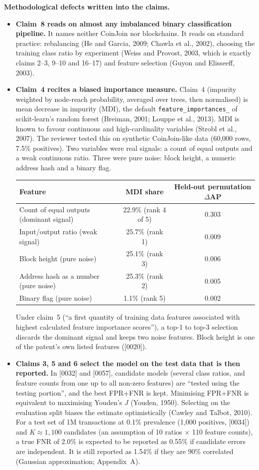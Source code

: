 \documentclass[10pt,a4paper]{article}
\begin{document}
\noindent\textbf{Methodological defects written into the claims.}
\begin{itemize}
  \item \textbf{Claim~8 reads on almost any imbalanced binary classification pipeline.} It names neither CoinJoin nor blockchains. It reads on standard practice: rebalancing (He and Garcia, 2009; Chawla et al., 2002), choosing the training class ratio by experiment (Weiss and Provost, 2003, which is exactly claims 2--3, 9--10 and 16--17) and feature selection (Guyon and Elisseeff, 2003).
  \item \textbf{Claim~4 recites a biased importance measure.} Claim~4 (impurity weighted by node-reach probability, averaged over trees, then normalised) is mean decrease in impurity (MDI), the default \texttt{feature\_importances\_} of scikit-learn's random forest (Breiman, 2001; Louppe et al., 2013). MDI is known to favour continuous and high-cardinality variables (Strobl et al., 2007). The reviewer tested this on synthetic CoinJoin-like data (60,000 rows, 7.5\% positives). Two variables were real signals: a count of equal outputs and a weak continuous ratio. Three were pure noise: block height, a numeric address hash and a binary flag.
  \begin{center}\small
  \begin{tabular}{lcc}
  \toprule
  Feature & MDI share & Held-out permutation $\Delta$AP \\
  \midrule
  Count of equal outputs (dominant signal) & 22.9\% (rank 4 of 5) & 0.303 \\
  Input/output ratio (weak signal) & 25.7\% (rank 1) & 0.009 \\
  Block height (pure noise) & 25.1\% (rank 3) & 0.006 \\
  Address hash as a number (pure noise) & 25.3\% (rank 2) & 0.005 \\
  Binary flag (pure noise) & 1.1\% (rank 5) & 0.002 \\
  \bottomrule
  \end{tabular}
  \end{center}
  Under claim~5 (``a first quantity of training data features associated with highest calculated feature importance scores''), a top-1 to top-3 selection discards the dominant signal and keeps two noise features. Block height is one of the patent's own listed features ([0020]).
  \item \textbf{Claims 3, 5 and 6 select the model on the test data that is then reported.} In [0032] and [0057], candidate models (several class ratios, and feature counts from one up to all non-zero features) are ``tested using the testing portion'', and the best FPR+FNR is kept. Minimising FPR+FNR is equivalent to maximising Youden's $J$ (Youden, 1950). Selecting on the evaluation split biases the estimate optimistically (Cawley and Talbot, 2010). For a test set of 1M transactions at 0.1\% prevalence (1,000 positives, [0034]) and $K\approx1{,}100$ candidates (an assumption of 10 ratios $\times$ 110 feature counts), a true FNR of 2.0\% is expected to be reported as 0.55\% if candidate errors are independent. It is still reported as 1.54\% if they are 90\% correlated (Gaussian approximation; Appendix~A).

\end{itemize}
\end{document}
